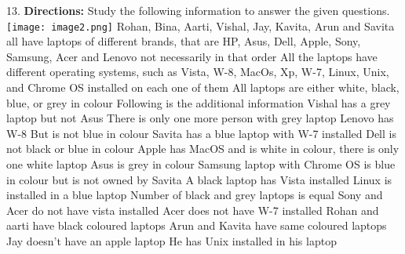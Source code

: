 \documentclass[
]{article}
\begin{document}
13. \textbf{Directions:} Study the following information to answer the given questions.\\
\texttt{[image: image2.png]}
Rohan, Bina, Aarti, Vishal, Jay, Kavita, Arun and Savita all have laptops of different brands,
that are HP, Asus, Dell, Apple, Sony, Samsung, Acer and Lenovo not necessarily in that
order All the laptops have different operating systems, such as Vista, W-8, MacOs, Xp, W-7,
Linux, Unix, and Chrome OS installed on each one of them All laptops are either white,
black, blue, or grey in colour
Following is the additional information
Vishal has a grey laptop but not Asus There is only one more person with grey laptop
Lenovo has W-8 But is not blue in colour
Savita has a blue laptop with W-7 installed Dell is not black or blue in colour
Apple has MacOS and is white in colour, there is only one white laptop Asus is grey in
colour
Samsung laptop with Chrome OS is blue in colour but is not owned by Savita
A black laptop has Vista installed Linux is installed in a blue laptop Number of black and
grey laptops is equal
Sony and Acer do not have vista installed Acer does not have W-7 installed
Rohan and aarti have black coloured laptops Arun and Kavita have same coloured laptops
Jay doesn’t have an apple laptop He has Unix installed in his laptop\\
\end{document}
